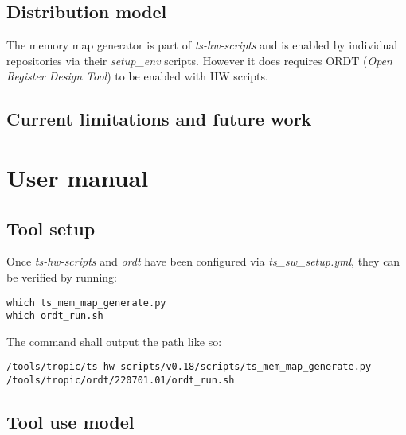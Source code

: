 \documentclass{tropic_design_spec}
\begin{document}
\subsection*{Distribution model}
The memory map generator is part of \textit{ts-hw-scripts} and is enabled by individual
repositories via their \textit{setup_env} scripts. However it does requires ORDT
(\textit{Open Register Design Tool}) to be enabled with HW scripts.

\subsection*{Current limitations and future work}


\pagebreak
\section{User manual}

\subsection{Tool setup}
\label{sec:tool-setup}

Once \textit{ts-hw-scripts} and \textit{ordt} have been configured via \textit{ts_sw_setup.yml},
they can be verified by running: 
\begin{lstlisting}
which ts_mem_map_generate.py
which ordt_run.sh
\end{lstlisting}
    The command shall output the path like so:
\begin{lstlisting}
/tools/tropic/ts-hw-scripts/v0.18/scripts/ts_mem_map_generate.py
/tools/tropic/ordt/220701.01/ordt_run.sh
\end{lstlisting}

\pagebreak
\subsection{Tool use model}
\end{document}
